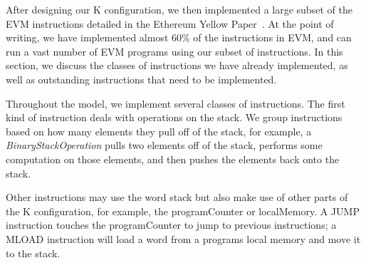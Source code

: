 After designing our K configuration, we then implemented a large subset of the
EVM instructions detailed in the Ethereum Yellow Paper~\cite{gavwood}. At the
point of writing, we have implemented almost 60\% of the instructions in EVM,
and can run a vast number of EVM programs using our subset of instructions. In
this section, we discuss the classes of instructions we have already implemented, as
well as outstanding instructions that need to be implemented.

Throughout the model, we implement several classes of instructions. The first
kind of instruction deals with operations on the stack. We group instructions
based on how many elements they pull off of the stack, for example, a
\textit{BinaryStackOperation} pulls two elements off of the stack, performs some
computation on those elements, and then pushes the elements back onto the stack.

Other instructions may use the word stack but also make use of other parts of
the K configuration, for example, the programCounter or localMemory. A JUMP
instruction touches the programCounter to jump to previous instructions; a MLOAD
instruction will load a word from a program\textquotesingle s local memory and move it to the
stack.

